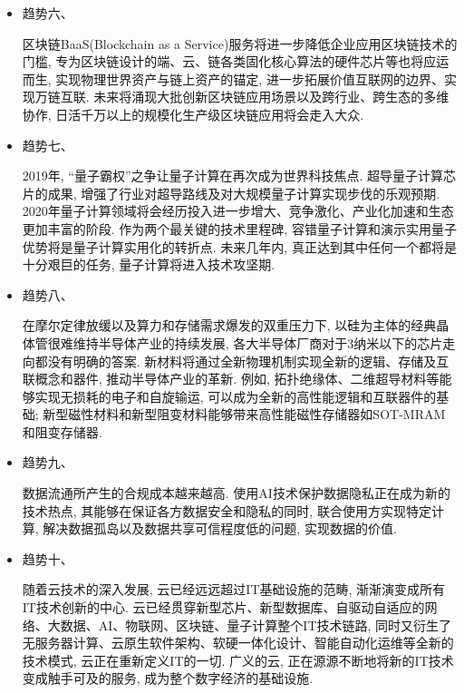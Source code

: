 \begin{itemize}
\item  趋势六、

区块链BaaS(Blockchain as a Service)服务将进一步降低企业应用区块链技术的门槛, 专为区块链设计的端、云、链各类固化核心算法的硬件芯片等也将应运而生, 实现物理世界资产与链上资产的锚定, 进一步拓展价值互联网的边界、实现万链互联. 未来将涌现大批创新区块链应用场景以及跨行业、跨生态的多维协作, 日活千万以上的规模化生产级区块链应用将会走入大众.

\item  趋势七、

2019年, “量子霸权”之争让量子计算在再次成为世界科技焦点. 超导量子计算芯片的成果, 增强了行业对超导路线及对大规模量子计算实现步伐的乐观预期. 2020年量子计算领域将会经历投入进一步增大、竞争激化、产业化加速和生态更加丰富的阶段. 作为两个最关键的技术里程碑, 容错量子计算和演示实用量子优势将是量子计算实用化的转折点. 未来几年内, 真正达到其中任何一个都将是十分艰巨的任务, 量子计算将进入技术攻坚期.

\item  趋势八、

在摩尔定律放缓以及算力和存储需求爆发的双重压力下, 以硅为主体的经典晶体管很难维持半导体产业的持续发展, 各大半导体厂商对于3纳米以下的芯片走向都没有明确的答案. 新材料将通过全新物理机制实现全新的逻辑、存储及互联概念和器件, 推动半导体产业的革新. 例如, 拓扑绝缘体、二维超导材料等能够实现无损耗的电子和自旋输运, 可以成为全新的高性能逻辑和互联器件的基础; 新型磁性材料和新型阻变材料能够带来高性能磁性存储器如SOT-MRAM和阻变存储器.

\item  趋势九、

数据流通所产生的合规成本越来越高. 使用AI技术保护数据隐私正在成为新的技术热点, 其能够在保证各方数据安全和隐私的同时, 联合使用方实现特定计算, 解决数据孤岛以及数据共享可信程度低的问题, 实现数据的价值.

\item  趋势十、

随着云技术的深入发展, 云已经远远超过IT基础设施的范畴, 渐渐演变成所有IT技术创新的中心. 云已经贯穿新型芯片、新型数据库、自驱动自适应的网络、大数据、AI、物联网、区块链、量子计算整个IT技术链路, 同时又衍生了无服务器计算、云原生软件架构、软硬一体化设计、智能自动化运维等全新的技术模式, 云正在重新定义IT的一切. 广义的云, 正在源源不断地将新的IT技术变成触手可及的服务, 成为整个数字经济的基础设施.
\end{itemize}
